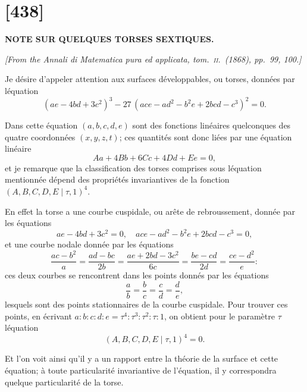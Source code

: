 \documentclass[11pt,a4paper]{article}
\begin{document}
\newpage
\section*{[438]}

\begin{center}
\textbf{\Large NOTE SUR QUELQUES TORSES SEXTIQUES.}
\end{center}

\begin{flushright}
\textit{[From the \textit{Annali di Matematica pura ed applicata}, tom.\ \textsc{ii}.\ (1868), pp.\ 99, 100.]}
\end{flushright}

\vspace{1em}

\noindent
Je d\'{e}sire d'appeler attention aux surfaces d\'{e}veloppables, ou torses, donn\'{e}es par l\'{e}quation
\[
(ae - 4bd + 3c^2)^3 - 27\,(ace - ad^2 - b^2e + 2bcd - c^3)^2 = 0.
\]

Dans cette \'{e}quation $(a, b, c, d, e)$ sont des fonctions lin\'{e}aires quelconques des quatre coordonn\'{e}es $(x, y, z, t)$; ces quantit\'{e}s sont donc li\'{e}es par une \'{e}quation lin\'{e}aire
\[
Aa + 4Bb + 6Cc + 4Dd + Ee = 0,
\]
et je remarque que la classification des torses comprises sous l\'{e}quation mentionn\'{e}e d\'{e}pend des propri\'{e}t\'{e}s invariantives de la fonction $(A, B, C, D, E \mid \tau, 1)^4$.

En effet la torse a une courbe cuspidale, ou ar\^{e}te de rebroussement, donn\'{e}e par les \'{e}quations
\[
ae - 4bd + 3c^2 = 0,\quad ace - ad^2 - b^2e + 2bcd - c^3 = 0,
\]
et une courbe nodale donn\'{e}e par les \'{e}quations
\[
\frac{ac - b^2}{a} = \frac{ad - bc}{2b} = \frac{ae + 2bd - 3c^2}{6c} = \frac{be - cd}{2d} = \frac{ce - d^2}{e}:
\]
ces deux courbes se rencontrent dans les points donn\'{e}s par les \'{e}quations
\[
\frac{a}{b} = \frac{b}{c} = \frac{c}{d} = \frac{d}{e},
\]
lesquels sont des points stationnaires de la courbe cuspidale. Pour trouver ces points, en \'{e}crivant $a : b : c : d : e = \tau^4 : \tau^3 : \tau^2 : \tau : 1$, on obtient pour le param\`{e}tre $\tau$ l\'{e}quation
\[
(A, B, C, D, E \mid \tau, 1)^4 = 0.
\]

Et l'on voit ainsi qu'il y a un rapport entre la th\'{e}orie de la surface et cette \'{e}quation; \`{a} toute particularit\'{e} invariantive de l'\'{e}quation, il y correspondra quelque particularit\'{e} de la torse.
\end{document}
